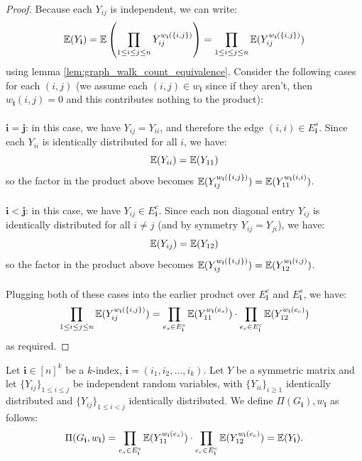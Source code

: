 \begin{proof}
\notready
Because each $Y_{ij}$ is independent, we can write:
$$
{\mathbb{E}}(Y_{\mathbf{i}}) = {\mathbb{E}}\left(\prod_{1 \leq i \leq j \leq n} Y_{ij}^{w_{\mathbf{i}}(\{i, j\})}\right) = \prod_{1 \leq i \leq j \leq n} {\mathbb{E}}(Y_{ij}^{w_{\mathbf{i}}(\{i, j\})})
$$
using lemma \ref{lem:graph_walk_count_equivalence}. Consider the following cases for each $(i, j)$ (we assume each $(i, j) \in w_{\mathbf{i}}$ since if they aren't, then $w_{\mathbf{i}}(i, j) = 0$ and this contributes nothing to the product):\\\\
$\mathbf{i = j}$: in this case, we have $Y_{ij} = Y_{ii}$, and therefore the edge $(i, i) \in E_{\mathbf{i}}^{s}$. Since each $Y_{ii}$ is identically distributed for all $i$, we have:
$$
{\mathbb{E}}(Y_{ii}) = {\mathbb{E}}(Y_{11})
$$
so the factor in the product above becomes ${\mathbb{E}}(Y_{ij}^{w_{\mathbf{i}}(\{i, j\})}) = {\mathbb{E}}(Y_{11}^{w_{\mathbf{i}}(i, i)})$.\\\\
$\mathbf{i < j}$: in this case, we have  $Y_{ij} \in E_{\mathbf{i}}^{c}$. Since each non diagonal entry $Y_{ij}$ is identically distributed for all $i \neq j$ (and by symmetry $Y_{ij} = Y_{ji}$), we have:
$$
{\mathbb{E}}(Y_{ij}) = {\mathbb{E}}(Y_{12})
$$
so the factor in the product above becomes ${\mathbb{E}}(Y_{ij}^{w_{\mathbf{i}}(\{i, j\})}) = {\mathbb{E}}(Y_{12}^{w_{\mathbf{i}}(i, j)})$.\\\\
Plugging both of these cases into the earlier product over $E_{\mathbf{i}}^{c}$ and $E_{\mathbf{i}}^{s}$, we have:
 $$
 \prod_{1 \leq i \leq j \leq n} {\mathbb{E}}(Y_{ij}^{w_{\mathbf{i}}(\{i, j\})}) = \prod_{e_s \in E_{\mathbf{i}}^s} {\mathbb{E}}(Y_{11}^{w_{\mathbf{i}}(e_s)}) \cdot \prod_{e_c \in E_{\mathbf{i}}^c} {\mathbb{E}}(Y_{12}^{w_{\mathbf{i}}(e_c)})
$$
as required.

\end{proof}

\begin{definition}
    \label{def:expectation_matrix_multi_index}
    \notready
    Let $\mathbf{i} \in [n]^{k}$ be a $k$-index, $\mathbf{i} = (i_1, i_2, \ldots, i_{k})$. Let $Y$ be a symmetric matrix and let $\{Y_{ij}\}_{1\le i\le j}$ be independent random variables, with $\{Y_{ii}\}_{i\ge 1}$ identically distributed and $\{Y_{ij}\}_{1\le i<j}$ identically distributed. We define $\Pi(G_{\mathbf{i}}), w_{\mathbf{i}}$ as follows:
    $$
    \Pi (G_{\mathbf{i}}, w_{\mathbf{i}}) = \prod_{e_s \in E_{\mathbf{i}}^s} {\mathbb{E}}(Y_{11}^{w_{\mathbf{i}}(e_s)}) \cdot \prod_{e_c \in E_{\mathbf{i}}^c} {\mathbb{E}}(Y_{12}^{w_{\mathbf{i}}(e_c)}) = {\mathbb{E}}(Y_{\mathbf{i}}).
    $$
\end{definition}







